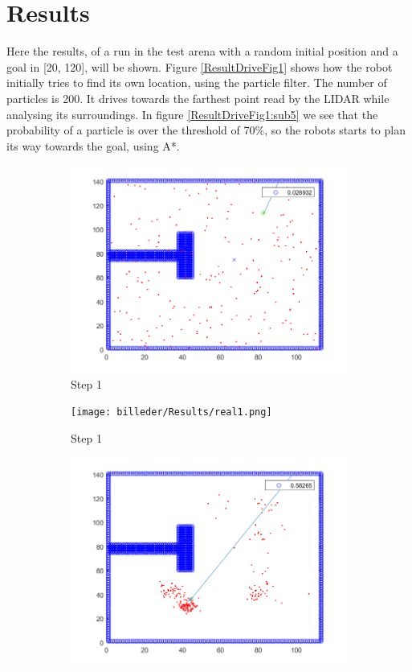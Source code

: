\section{Results}
Here the results, of a run in the test arena with a random initial position and a goal in [20, 120], will be shown.
Figure \ref{ResultDriveFig1} shows how the robot initially tries to find its own location, using the particle filter. The number of particles is 200. It drives towards the farthest point read by the LIDAR while analysing its surroundings. In figure \ref{ResultDriveFig1:sub5} we see that the probability of a particle is over the threshold of 70\%, so the robots starts to plan its way towards the goal, using A*. 
\begin{figure}[H]
\centering
\begin{subfigure}{.5\textwidth}
  \centering
  \includegraphics[width=.8\linewidth]{billeder/Results/1.png}
  \caption{Step 1}
  \label{ResultDriveFig1:sub1}
\end{subfigure}%
\begin{subfigure}{.5\textwidth}
  \centering
  \texttt{[image: billeder/Results/real1.png]}
  \caption{Step 1}
  \label{ResultDriveFig1:sub2}
\end{subfigure}
\begin{subfigure}{.5\textwidth}
  \centering
  \includegraphics[width=.8\linewidth]{billeder/Results/3.png}

\end{subfigure}
\end{figure}
